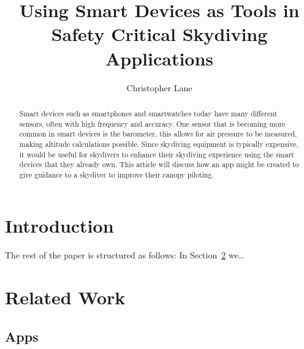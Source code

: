 \documentclass[11pt, twocolumn]{article}
\title{Using Smart Devices as Tools in Safety Critical Skydiving Applications}
\author{Christopher Lane}
\begin{document}
\maketitle

\begin{abstract} %
Smart devices such as smartphones and smartwatches today have many different sensors, often with high frequency and accuracy. One sensor that is becoming more common in smart devices is the barometer, this allows for air pressure to be measured, making altitude calculations possible. Since skydiving equipment is typically expensive, it would be useful for skydivers to enhance their skydiving experience using the smart devices that they already own. This article will discuss how an app might be created to give guidance to a skydiver to improve their canopy piloting.
\end{abstract}

\section{Introduction}\label{sec:introduction} %







The rest of the paper is structured as follows: In Section~\ref{sec:related-work} we\dots


\section{Related Work}\label{sec:related-work}
\subsection{Apps}\label{sec:apps} %
\end{document}
